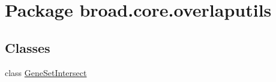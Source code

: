 \hypertarget{namespacebroad_1_1core_1_1overlaputils}{\section{Package broad.\+core.\+overlaputils}
\label{namespacebroad_1_1core_1_1overlaputils}
}
\subsection*{Classes}
\begin{DoxyCompactItemize}
\item 
class \hyperlink{classbroad_1_1core_1_1overlaputils_1_1_gene_set_intersect}{Gene\+Set\+Intersect}
\end{DoxyCompactItemize}
